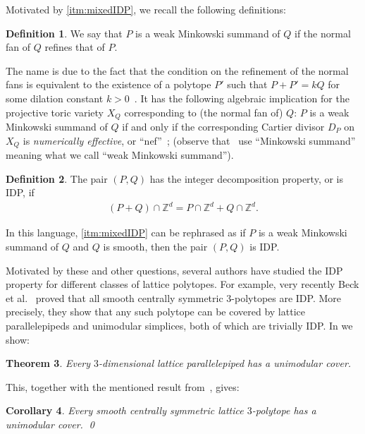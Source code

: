 \documentclass{amsart}
\theoremstyle{plain}
\newtheorem{theorem}{Theorem}[section]
\newtheorem{corollary}[theorem]{Corollary}
\theoremstyle{definition}
\newtheorem{definition}[theorem]{Definition}
\newcommand{\Z}{ \ensuremath{\mathbb{Z}}}
\newcommand{\paco}[1]{\todo[size=\tiny,color=green!30]{#1 \\ \hfill --- P.}}
\begin{document}
Motivated by  \eqref{itm:mixedIDP}, we recall the following definitions:

\begin{definition}
We say that $P$ is a weak Minkowski summand of $Q$ if the normal fan of $Q$ refines that of $P$.
\end{definition}
The name is due to the fact that the condition on the refinement of the normal fans is equivalent to the existence of a polytope $P'$ such that $P+P' = k Q$ for some dilation constant $k>0$~\cite[??]{Grunbaum}. 
It has the following algebraic implication for the projective toric variety $X_Q$ corresponding to (the normal fan of) $Q$: $P$ is a weak Minkowski summand of $Q$ if and only if the corresponding Cartier divisor $D_P$ on  $X_Q$ is \emph{numerically effective}, or ``nef''~\cite[Cor.~6.2.15, Prop.~6.3.12]{CLS}; (observe that~\cite{CLS} use ``Minkowski summand'' meaning what we call ``weak Minkowski summand''). 
\paco{added this explanation}

\begin{definition}
The pair $(P, Q)$ has the integer decomposition property, or is IDP, if 
\begin{align*}
(P+Q) \cap \Z^d = P \cap \Z^d + Q \cap \Z^d.
\end{align*}
\end{definition}
 
In this language,  \eqref{itm:mixedIDP} can be rephrased as if $P$ is a weak Minkowski summand of $Q$ and $Q$ is smooth, then the pair $(P,Q)$ is IDP.


Motivated by these and other questions, several authors have studied the IDP property for different classes of lattice polytopes. 
%
For example,  very recently
Beck et al.~\cite{BHHHJKM2019} proved that all smooth centrally symmetric $3$-polytopes are IDP.
More precisely, they show that any such polytope can be covered by lattice 
parallelepipeds and unimodular simplices, both of which are trivially IDP.
%
In  we show:

\begin{theorem}
\label{thm:parallelepipeds}
Every $3$-dimensional lattice parallelepiped has a unimodular cover.
\end{theorem}

This, together with the mentioned result from~\cite{BHHHJKM2019}, gives:

\begin{corollary}
\label{coro:3cs}
Every smooth centrally symmetric lattice $3$-polytope has a unimodular cover. 
\qed
\end{corollary}
\end{document}
